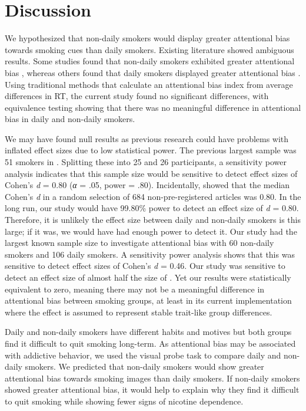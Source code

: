 \documentclass[empirical, authordate, issue]{jote-new-article}
\begin{document}
\section{Discussion}

We hypothesized that non-daily smokers would display greater attentional bias towards smoking cues than daily smokers. Existing literature showed ambiguous results. Some studies found that non-daily smokers exhibited greater attentional bias \parencite{Bradley2003, Hogarth2003, Mogg2005}, whereas others found that daily smokers displayed greater attentional bias \parencite{Chanon2010, Vollstädt-Klein2011, Zack2001}. Using traditional methods that calculate an attentional bias index from average differences in RT, the current study found no significant differences, with equivalence testing showing that there was no meaningful difference in attentional bias in daily and non-daily smokers.

We may have found null results as previous research could have problems with inflated effect sizes due to low statistical power. The previous largest sample was 51 smokers in \textcite{Vollstädt-Klein2011}. Splitting these into 25 and 26 participants, a sensitivity power analysis indicates that this sample size would be sensitive to detect effect sizes of Cohen's \emph{d} = 0.80 (\emph{α} = .05, power = .80). Incidentally, \textcite{Schaefer2019} showed that the median Cohen's \emph{d} in a random selection of 684 non-pre-registered articles was 0.80. In the long run, our study would have 99.80\% power to detect an effect size of \emph{d} = 0.80. Therefore, it is unlikely the effect size between daily and non-daily smokers is this large; if it was, we would have had enough power to detect it. Our study had the largest known sample size to investigate attentional bias with 60 non-daily smokers and 106 daily smokers. A sensitivity power analysis shows that this was sensitive to detect effect sizes of Cohen's \emph{d} = 0.46. Our study was sensitive to detect an effect size of almost half the size of \textcite{Vollstädt-Klein2011}. Yet our results were statistically equivalent to zero, meaning there may not be a meaningful difference in attentional bias between smoking groups, at least in its current implementation where the effect is assumed to represent stable trait-like group differences.

\begin{originalPurpose}

  Daily and non-daily smokers have different habits and motives but both groups find it difficult to quit smoking long-term. As attentional bias may be associated with addictive behavior, we used the visual probe task to compare daily and non-daily smokers. We predicted that non-daily smokers would show greater attentional bias towards smoking images than daily smokers. If non-daily smokers showed greater attentional bias, it would help to explain why they find it difficult to quit smoking while showing fewer signs of nicotine dependence.

\end{originalPurpose}
\end{document}

